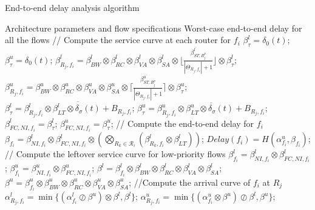 \documentclass[preprint]{elsarticle}
\begin{document}
\begin{algorithm}
\caption{End-to-end delay analysis algorithm}
\label{alg:equivalentservicecurve}
\begin{algorithmic}[1]
\Require Architecture parameters and flow specifications
\Ensure Worst-case end-to-end delay for all the flows
        \State // Compute the service curve at each router for $f_i$
        \State $\beta_{\tau}^l=\delta_0(t)$;
        \State $\beta_{\tau}^u=\delta_0(t)$;
            \State $\beta_{R_j,f_i}^l=\beta_{BW}^l\otimes\beta_{RC}^l\otimes\beta_{VA}^l\otimes\beta_{SA}^l\otimes\lfloor\frac{\beta_{ST,R_j^{p}}^{l^\prime}}{|\Theta_{R_j,f_i}|+1}\rfloor\otimes\beta_{\tau}^l$;
            \State $\beta_{R_j,f_i}^u=\beta_{BW}^u\otimes\beta_{RC}^u\otimes\beta_{VA}^u\otimes\beta_{SA}^u\otimes\lceil\frac{\beta_{ST,R_j^{p}}^{u^\prime}}{|\Theta_{R_j,f_i}|+1}\rceil\otimes\beta_{\tau}^u$;
            \State $\beta_{\tau}^l=\overline{\beta^l_{R_j,f_i}\otimes\beta_{LT}^l\otimes\delta_\sigma(t)+B_{R_j,f_i}}$;
            \State $\beta_{\tau}^u=\overline{\beta^u_{R_j,f_i}\otimes\beta_{LT}^u\otimes\delta_\sigma(t)+B_{R_j,f_i}}$;
        \EndFor
        \State $\beta_{FC,NI,f_i}^l=\beta^l_{\tau}$;
        \State $\beta_{FC,NI,f_i}^u=\beta^u_{\tau}$;
        \State // Compute the end-to-end delay for $f_i$
        \State $\beta_{f_i}=\beta_{NI,f_i}^l\otimes\beta_{FC,NI,f_i}^l\otimes (\underset{R_k\in\mathcal{R}_{i}}{\bigotimes}(\beta^l_{R_k,f_i}\otimes\beta^l_{LT}))$;
        \State $Delay(f_i)=H(\alpha^u_{f_i},\beta_{f_i})$;
        \State // Compute the leftover service curve for low-priority flows
        \State $\beta_{f_i}^l=\beta_{NI,f_i}^l\otimes\beta_{FC,NI,f_i}^l$;
        \State $\beta_{f_i}^u=\beta_{NI,f_i}^u\otimes\beta_{FC,NI,f_i}^u$;
                \State $\beta^l=\beta^l_{f_i}\otimes\beta_{BW}^l\otimes\beta_{RC}^l\otimes\beta_{VA}^l\otimes\beta_{SA}^l$;
                \State $\beta^u=\beta^u_{f_i}\otimes\beta_{BW}^u\otimes\beta_{RC}^u\otimes\beta_{VA}^u\otimes\beta_{SA}^u$;
                \State //Compute the arrival curve of $f_i$ at $R_j$
                \State $\alpha^l_{R_j,f_i}=\min\{(\alpha^l_{f_i}\oslash\beta^u)\otimes\beta^l,\beta^l\}$;
                \State $\alpha^u_{R_j,f_i}=\min\{(\alpha^u_{f_i}\otimes\beta^u)\oslash\beta^l,\beta^u\}$;

\end{algorithmic}
\end{algorithm}
\end{document}
